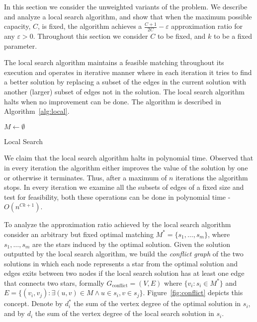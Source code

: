 In this section we consider the unweighted variants of the problem.
We describe and analyze a local search algorithm, 
and show that when the maximum possible capacity, $C$, is fixed, the algorithm achieves 
a $\frac{C + 1}{2C} - \varepsilon$ 
approximation ratio for any $\varepsilon > 0$.
Throughout this section we consider $C$ to be fixed, and $k$ to be a fixed parameter.  

The local search algorithm maintains a feasible matching throughout its execution
and operates in 
iterative manner where in each iteration it tries to find a better solution by
replacing a subset of the edges in the current solution with 
another (larger) subset of edges not in the solution.
The local search algorithm halts when no improvement can be done.
The algorithm is described in Algorithm~\ref{alg:local}. 

\begin{algorithm}
$M \leftarrow \emptyset$								\\

\caption{
\label{alg:local}
Local Search}
\end{algorithm}


We claim that the local search algorithm halts in polynomial time.
Observed that in every iteration the algorithm either improves the value of the solution
by one or otherwise it terminates. 
Thus, after a maximum of $n$ iterations the algorithm stops.
In every iteration we examine all the subsets of edges of a fixed size and test for feasibility,
both these operations can be done in polynomial time - $O(n^{Ck + 1})$. 

To analyze the approximation ratio achieved by the local search algorithm consider an 
arbitrary but fixed optimal matching $M^* = \{s_1, \ldots, s_m\}$,
where $s_1, \ldots, s_m$ are the stars induced by the optimal solution.
Given the solution outputted by the local search algorithm,
we build the \emph{conflict graph} of the two solutions in which each node
represents a star from the optimal solution and edges exits between two nodes if
the local search solution has at least one edge that connects two stars, formally 
$G_\text{conflict} = (V, E)$ 
where $\{v_i : s_i \in M^* \}$ 
and $E = \{(v_i, v_j) : \exists (u,v) \in M \land u \in s_i, v \in s_j \}$.
Figure~\ref{fig:conflict} depicts this concept.
Denote by $d^*_i$ the sum of the vertex degree of the optimal solution in $s_i$, 
and by $d_i$ the sum of the vertex degree of the local search solution in $s_i$.

